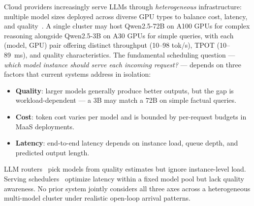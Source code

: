 \documentclass[10pt]{article}
\begin{document}
Cloud providers increasingly serve LLMs through \emph{heterogeneous} infrastructure: multiple model sizes deployed across diverse GPU types to balance cost, latency, and quality~\cite{openaiIntroducingGPT5,microsoftModelRouter}. A single cluster may host Qwen2.5-72B on A100 GPUs for complex reasoning alongside Qwen2.5-3B on A30 GPUs for simple queries, with each (model, GPU) pair offering distinct throughput (10–98 tok/s), TPOT (10–89~ms), and quality characteristics. The fundamental scheduling question — \emph{which model instance should serve each incoming request?} — depends on three factors that current systems address in isolation:
\begin{itemize}\itemsep0pt
\item \textbf{Quality}: larger models generally produce better outputs, but the gap is workload-dependent — a 3B may match a 72B on simple factual queries.
\item \textbf{Cost}: token cost varies per model and is bounded by per-request budgets in MaaS deployments.
\item \textbf{Latency}: end-to-end latency depends on instance load, queue depth, and predicted output length.
\end{itemize}
LLM routers~\cite{Ong2024RouteLLMLT,universal_model_routering,chen2023frugalgpthowuse,mei2025eccosefficientcapability} pick models from quality estimates but ignore instance-level load. Serving schedulers~\cite{da2025blockbalancingloadllm,zhong2024distservedisaggregatingprefilldecoding,qlm} optimize latency within a fixed model pool but lack quality awareness. No prior system jointly considers all three axes across a heterogeneous multi-model cluster under realistic open-loop arrival patterns.
\end{document}

